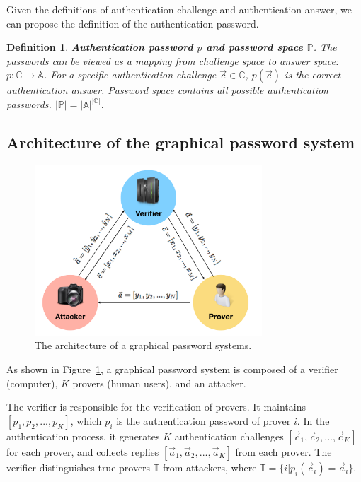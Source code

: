 \documentclass{article}
\newtheorem{definition}{Definition}
\begin{document}
Given the definitions of authentication challenge and authentication answer, we can propose the definition of the authentication password.
\begin{definition}
\textbf{Authentication password $p$ and password space $\mathbb{P}$}. The passwords can be viewed as a mapping from challenge space to answer space:
$p:\mathbb{C}\rightarrow\mathbb{A}$. For a specific authentication challenge $\vec c \in \mathbb{C}$, $p(\vec c)$
    is the correct authentication answer. Password space contains all possible authentication passwords.
    $|\mathbb{P}|
    = |\mathbb{A}|^{|\mathbb{C}|}$.
\end{definition}

\subsection{Architecture of the graphical password system}
  \begin{figure}[htb]
    \centering
    \includegraphics[width=8.5cm]{architecture.pdf}
    \caption{The architecture of a graphical password systems. }
    \label{fig:architecture} %
  \end{figure}

As shown in Figure~\ref{fig:architecture}, a graphical password system is composed of a verifier (computer), $K$ provers (human users), and an attacker.

The verifier is responsible for the verification of provers. It maintains $[p_1, p_2,...,p_{K}]$, which $p_i$ is the authentication password of prover $i$. In the authentication process, it generates $K$
authentication challenges $[\vec{c}_1, \vec{c}_2,...,\vec{c}_{K}]$ for each prover, and collects replies
$[\vec{a}_1,\vec{a}_2,...,\vec{a}_{K}]$ from each prover. The verifier distinguishes true provers $\mathbb{T}$
from attackers, where $\mathbb{T} = \{i|p_i(\vec{c}_i) = \vec{a}_i\}$.
\end{document}
